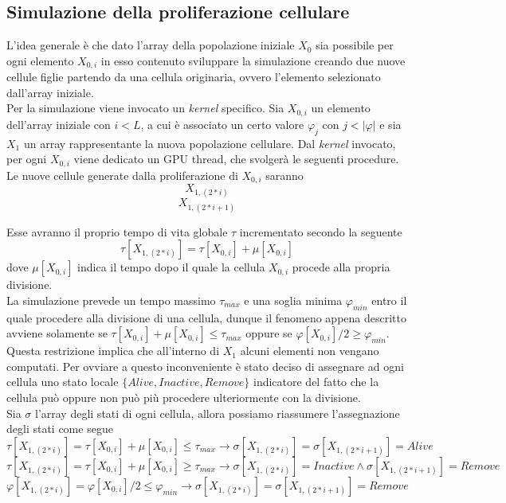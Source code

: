 \subsection{Simulazione della proliferazione cellulare}

L'idea generale è che dato l'array della popolazione iniziale $X_{0}$
sia possibile per ogni elemento $X_{0,i}$ in esso contenuto sviluppare
la simulazione creando due nuove cellule figlie partendo da una cellula
originaria, ovvero l'elemento selezionato dall'array iniziale.
\\
Per la simulazione viene invocato un \textit{kernel} specifico.
Sia $X_{0,i}$ un elemento dell'array iniziale
con $i < L$, a cui è associato un certo valore $\varphi_{j}$
con $j < |\varphi|$ e sia $X_{1}$ un array rappresentante la nuova
popolazione cellulare.
Dal \textit{kernel} invocato, per ogni $X_{0,i}$ viene dedicato un GPU thread,
che svolgerà le seguenti procedure.
\\
Le nuove cellule generate dalla proliferazione
di $X_{0, i}$ saranno $$X_{1, (2 * i)}$$ $$X_{1, (2 * i + 1)}$$

Esse avranno il proprio tempo di vita globale $\tau$
incrementato secondo la seguente
$$\tau[X_{1, (2 * i)}] = \tau[X_{0, i}] + \mu[X_{0, i}]$$
dove $\mu[X_{0, i}]$ indica il tempo dopo il quale la cellula $X_{0,i}$
procede alla propria divisione.
\\
La simulazione prevede un tempo massimo $\tau_{max}$ e una soglia minima
$\varphi_{min}$ entro il quale procedere
alla divisione di una cellula, dunque il fenomeno appena descritto avviene
solamente se $\tau[X_{0, i}] + \mu[X_{0, i}] \leqslant \tau_{max}$ oppure se
$\varphi[X_{0, i}] / 2 \geqslant \varphi_{min}$.
Questa restrizione implica che all'interno di $X_{1}$ alcuni elementi non
vengano computati. Per ovviare a questo inconveniente è stato deciso di
assegnare ad ogni cellula uno stato locale $\{Alive, Inactive, Remove\}$
indicatore del fatto che la cellula
può oppure non può più procedere ulteriormente con la divisione.
\\
Sia $\sigma$ l'array degli stati di ogni cellula, allora possiamo riassumere
l'assegnazione degli stati come segue
$$\tau[X_{1, (2 * i)}] = \tau[X_{0, i}] + \mu[X_{0, i}] \leqslant \tau_{max}
\longrightarrow \sigma[X_{1, (2 * i)}] = \sigma[X_{1, (2 * i + 1)}] = Alive$$
$$\tau[X_{1, (2 * i)}] = \tau[X_{0, i}] + \mu[X_{0, i}] \geqslant \tau_{max}
\longrightarrow \sigma[X_{1, (2 * i)}] = Inactive \land
\sigma[X_{1, (2 * i + 1)}] = Remove$$
$$\varphi[X_{1, (2 * i)}] = \varphi[X_{0, i}] / 2 \leqslant \varphi_{min}
\longrightarrow \sigma[X_{1, (2 * i)}] = \sigma[X_{1, (2 * i + 1)}] = Remove$$

